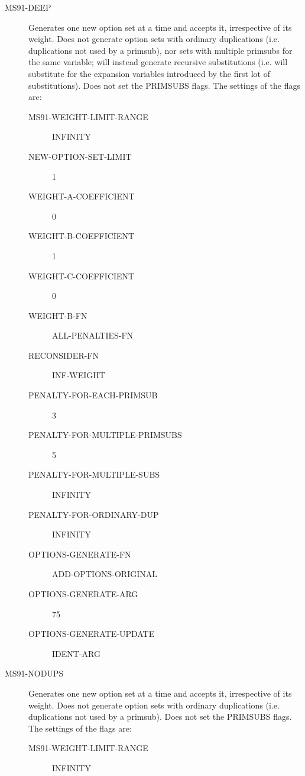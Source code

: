 \begin{description} 
\item[MS91-DEEP]  
Generates one new option set at a time and accepts it, 
irrespective of its weight. Does not generate option sets with ordinary 
duplications (i.e. duplications not used by a primsub), nor sets with 
multiple primsubs for the same variable; will instead generate recursive 
substitutions (i.e. will substitute for the expansion variables introduced
by the first lot of substitutions). Does not set the PRIMSUBS flags. The settings of the flags are:
\begin{description}
\item[MS91-WEIGHT-LIMIT-RANGE] INFINITY

\item[NEW-OPTION-SET-LIMIT] 1

\item[WEIGHT-A-COEFFICIENT] 0

\item[WEIGHT-B-COEFFICIENT] 1

\item[WEIGHT-C-COEFFICIENT] 0

\item[WEIGHT-B-FN] ALL-PENALTIES-FN

\item[RECONSIDER-FN] INF-WEIGHT

\item[PENALTY-FOR-EACH-PRIMSUB] 3

\item[PENALTY-FOR-MULTIPLE-PRIMSUBS] 5

\item[PENALTY-FOR-MULTIPLE-SUBS] INFINITY

\item[PENALTY-FOR-ORDINARY-DUP] INFINITY

\item[OPTIONS-GENERATE-FN] ADD-OPTIONS-ORIGINAL

\item[OPTIONS-GENERATE-ARG] 75

\item[OPTIONS-GENERATE-UPDATE] IDENT-ARG

\end{description}

\item[MS91-NODUPS]  
Generates one new option set at a time and accepts it, irrespective
of its weight. Does not generate option sets with ordinary duplications (i.e.
duplications not used by a primsub). Does not set the PRIMSUBS flags. The settings of the flags are:
\begin{description}
\item[MS91-WEIGHT-LIMIT-RANGE] INFINITY


\end{description}
\end{description}
